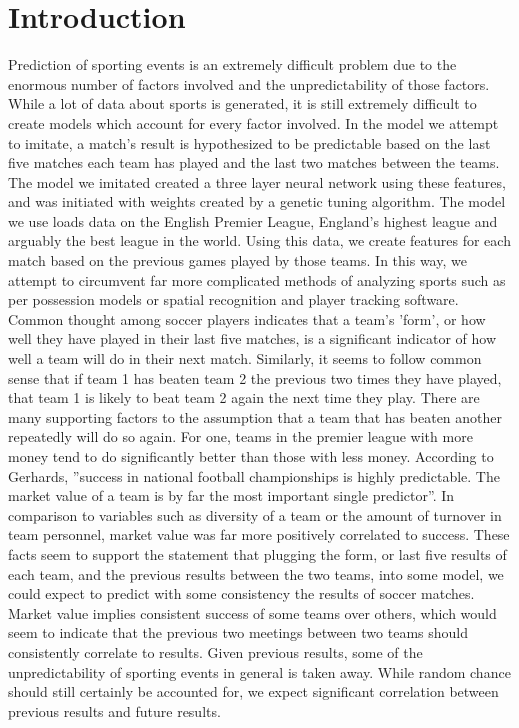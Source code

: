 \documentclass[sigconf]{acmart}
\begin{document}
\section{Introduction}
Prediction of sporting events is an extremely difficult problem due to the enormous number of factors involved and the unpredictability of those factors. While a lot of data about sports is generated, it is still extremely difficult to create models which account for every factor involved. In the model we attempt to imitate, a match's result is hypothesized to be predictable based on the last five matches each team has played and the last two matches between the teams. The model we imitated created a three layer neural network using these features, and was initiated with weights created by a genetic tuning algorithm. The model we use loads data on the English Premier League, England's highest league and arguably the best league in the world. Using this data, we create features for each match based on the previous games played by those teams. In this way, we attempt to circumvent far more complicated methods of analyzing sports such as per possession models or spatial recognition and player tracking software. Common thought among soccer players indicates that a team's 'form', or how well they have played in their last five matches, is a significant indicator of how well a team will do in their next match. Similarly, it seems to follow common sense that if team 1 has beaten team 2 the previous two times they have played, that team 1 is likely to beat team 2 again the next time they play. 
There are many supporting factors to the assumption that a team that has beaten another repeatedly will do so again. For one, teams in the premier league with more money tend to do significantly better than those with less money. According to Gerhards, ''success in national football championships is highly predictable. The market value of a team is by far the most important single predictor''. \cite{MarketValue} In comparison to variables such as diversity of a team or the amount of turnover in team personnel, market value was far more positively correlated to success.
These facts seem to support the statement that plugging the form, or last five results of each team, and the previous results between the two teams, into some model, we could expect to predict with some consistency the results of soccer matches. Market value implies consistent success of some teams over others, which would seem to indicate that the previous two meetings between two teams should consistently correlate to results. Given previous results, some of the unpredictability of sporting events in general is taken away. While random chance should still certainly be accounted for, we expect significant correlation between previous results and future results.
\end{document}
